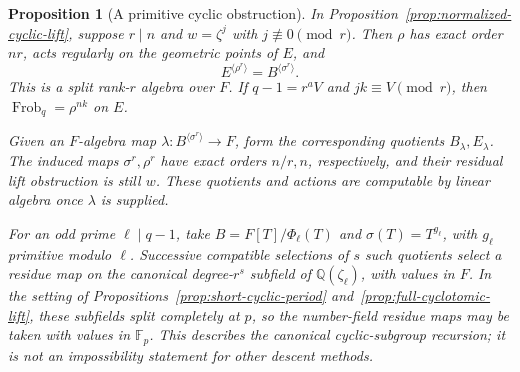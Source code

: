 \documentclass[11pt]{article}
\newtheorem{proposition}[theorem]{Proposition}
\theoremstyle{definition}
\theoremstyle{remark}
\begin{document}
\begin{proposition}[A primitive cyclic obstruction]
\label{prop:primitive-cyclic-obstruction}
In Proposition~\ref{prop:normalized-cyclic-lift}, suppose
\(r\mid n\) and \(w=\zeta^j\) with \(j\not\equiv0\pmod r\).
Then \(\rho\) has exact order \(nr\), acts regularly on the
geometric points of \(E\), and
\[
                   E^{\langle\rho^r\rangle}
                         =B^{\langle\sigma^r\rangle}.
\]
This is a split rank-\(r\) algebra over \(F\).
If \(q-1=r^aV\) and \(jk\equiv V\pmod r\), then
\(\operatorname{Frob}_q=\rho^{nk}\) on \(E\).

Given an \(F\)-algebra map
\(\lambda:B^{\langle\sigma^r\rangle}\to F\),
form the corresponding quotients \(B_\lambda,E_\lambda\).
The induced maps \(\sigma^r,\rho^r\) have exact orders
\(n/r,n\), respectively, and their residual lift obstruction
is still \(w\).
These quotients and actions are computable by linear algebra
once \(\lambda\) is supplied.

For an odd prime \(\ell\mid q-1\), take
\(B=F[T]/\Phi_\ell(T)\) and
\(\sigma(T)=T^{g_\ell}\), with \(g_\ell\) primitive modulo
\(\ell\).  Successive compatible selections of \(s\) such quotients
select a residue map on the canonical degree-\(r^s\)
subfield of \(\mathbb Q(\zeta_\ell)\), with values in \(F\).
In the setting of
Propositions~\ref{prop:short-cyclic-period}
and~\ref{prop:full-cyclotomic-lift}, these subfields split
completely at \(p\), so the number-field residue maps may be
taken with values in \(\mathbb F_p\).
This describes the canonical cyclic-subgroup
recursion; it is not an impossibility statement for other
descent methods.
\end{proposition}
\end{document}
